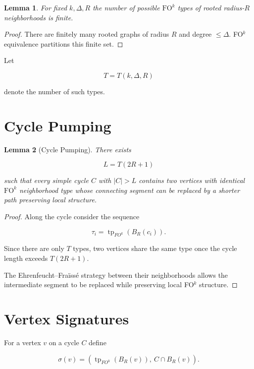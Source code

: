 \documentclass[11pt]{article}
\newtheorem{lemma}{Lemma}
\begin{document}
\begin{lemma}
For fixed $k,\Delta,R$ the number of possible
$\mathrm{FO}^k$ types of rooted radius-$R$ neighborhoods is finite.
\end{lemma}

\begin{proof}

There are finitely many rooted graphs of radius $R$ and
degree $\le\Delta$.
FO$^k$ equivalence partitions this finite set.

\end{proof}

Let

\[
T=T(k,\Delta,R)
\]

denote the number of such types.

\section{Cycle Pumping}

\begin{lemma}[Cycle Pumping]

There exists

\[
L=T(2R+1)
\]

such that every simple cycle $C$ with $|C|>L$ contains two vertices
with identical $\mathrm{FO}^k$ neighborhood type whose connecting
segment can be replaced by a shorter path preserving local structure.

\end{lemma}

\begin{proof}

Along the cycle consider the sequence

\[
\tau_i=\operatorname{tp}_{FO^k}(B_R(c_i)).
\]

Since there are only $T$ types,
two vertices share the same type once the cycle length exceeds
$T(2R+1)$.

The Ehrenfeucht--Fra\"iss\'e strategy between their neighborhoods
allows the intermediate segment to be replaced while preserving
local FO$^k$ structure.

\end{proof}

\section{Vertex Signatures}

For a vertex $v$ on a cycle $C$ define

\[
\sigma(v)=
(\operatorname{tp}_{FO^k}(B_R(v)),\ C\cap B_R(v)).
\]
\end{document}
